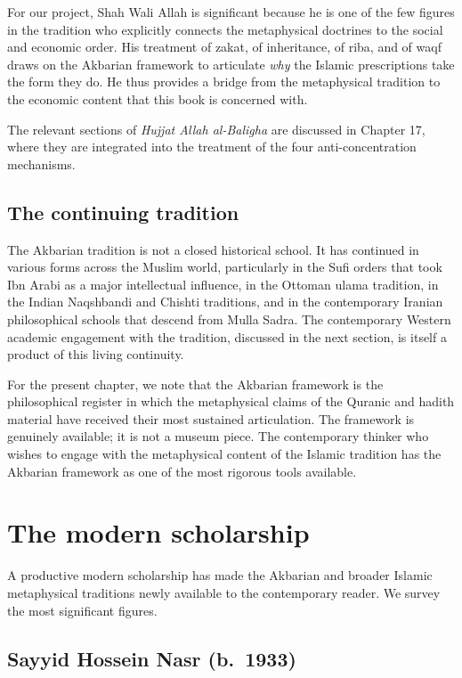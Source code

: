 For our project, Shah Wali Allah is significant because he is one of
the few figures in the tradition who explicitly connects the
metaphysical doctrines to the social and economic order. His
treatment of zakat, of inheritance, of riba, and of waqf draws on
the Akbarian framework to articulate \emph{why} the Islamic
prescriptions take the form they do. He thus provides a bridge from
the metaphysical tradition to the economic content that this book
is concerned with.

The relevant sections of \textit{Hujjat Allah al-Baligha} are
discussed in Chapter 17, where they are integrated into the
treatment of the four anti-concentration mechanisms.

\subsection{The continuing tradition}

The Akbarian tradition is not a closed historical school. It has
continued in various forms across the Muslim world, particularly in
the Sufi orders that took Ibn Arabi as a major intellectual
influence, in the Ottoman ulama tradition, in the Indian Naqshbandi
and Chishti traditions, and in the contemporary Iranian
philosophical schools that descend from Mulla Sadra. The
contemporary Western academic engagement with the tradition,
discussed in the next section, is itself a product of this living
continuity.

For the present chapter, we note that the Akbarian framework is the
philosophical register in which the metaphysical claims of the
Quranic and hadith material have received their most sustained
articulation. The framework is genuinely available; it is not a
museum piece. The contemporary thinker who wishes to engage with the
metaphysical content of the Islamic tradition has the Akbarian
framework as one of the most rigorous tools available.

\section{The modern scholarship}
\label{sec:modern-scholarship}

A productive modern scholarship has made the Akbarian and broader
Islamic metaphysical traditions newly available to the contemporary
reader. We survey the most significant figures.

\subsection{Sayyid Hossein Nasr (b.~1933)}

